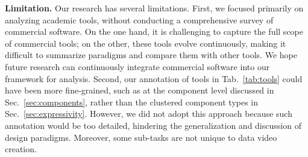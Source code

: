 \textbf{Limitation.}
Our research has several limitations. 
First, we focused primarily on analyzing academic tools, without conducting a comprehensive survey of commercial software. On the one hand, it is challenging to capture the full scope of commercial tools; on the other, these tools evolve continuously, making it difficult to summarize paradigms and compare them with other tools. 
We hope future research can continuously integrate commercial software into our framework for analysis.
Second, our annotation of tools in Tab.~\ref{tab:tools} could have been more fine-grained, such as at the component level discussed in Sec.~\ref{sec:components}, rather than the clustered component types in Sec.~\ref{sec:expressivity}. However, we did not adopt this approach because such annotation would be too detailed, hindering the generalization and discussion of design paradigms. Moreover, some sub-tasks are not unique to data video creation.




